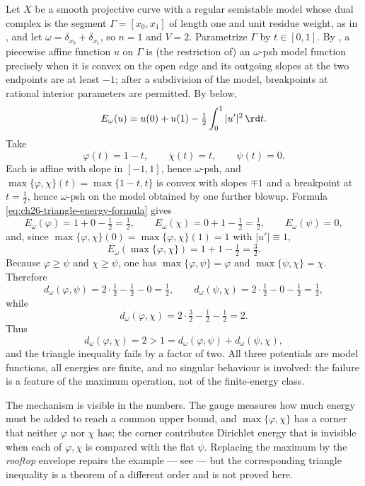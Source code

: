 \begin{example}
\label{ex:ch26-triangle-fails}
Let \(X\) be a smooth projective curve with a regular semistable model whose
dual complex is the segment \(\Gamma=[x_0,x_1]\) of length one and
unit residue weight, as in , and let
\(\omega=\delta_{x_0}+\delta_{x_1}\), so \(n=1\) and \(V=2\).  Parametrize
\(\Gamma\) by \(t\in[0,1]\).  By
, a piecewise affine function \(u\) on
\(\Gamma\) is (the restriction of) an \(\omega\)-psh model function precisely
when it is convex on the open edge and its outgoing slopes at the two
endpoints are at least \(-1\); after a subdivision of the model, breakpoints
at rational interior parameters are permitted.  By
 below,
\begin{equation}
\label{eq:ch26-triangle-energy-formula}
 E_\omega(u)=u(0)+u(1)-\tfrac12\int_0^1|u'|^2\,\rd t .
\end{equation}
Take
\[
 \varphi(t)=1-t,\qquad
 \chi(t)=t,\qquad
 \psi(t)=0 .
\]
Each is affine with slope in \([-1,1]\), hence \(\omega\)-psh, and
\(\max\{\varphi,\chi\}(t)=\max\{1-t,t\}\) is convex with slopes \(\mp1\) and
a breakpoint at \(t=\tfrac12\), hence \(\omega\)-psh on the model obtained by
one further blowup.  Formula \eqref{eq:ch26-triangle-energy-formula} gives
\[
 E_\omega(\varphi)=1+0-\tfrac12=\tfrac12,
 \qquad
 E_\omega(\chi)=0+1-\tfrac12=\tfrac12,
 \qquad
 E_\omega(\psi)=0,
\]
and, since \(\max\{\varphi,\chi\}(0)=\max\{\varphi,\chi\}(1)=1\) with
\(|u'|\equiv1\),
\[
 E_\omega(\max\{\varphi,\chi\})=1+1-\tfrac12=\tfrac32 .
\]
Because \(\varphi\geq\psi\) and \(\chi\geq\psi\), one has
\(\max\{\varphi,\psi\}=\varphi\) and \(\max\{\psi,\chi\}=\chi\).  Therefore
\[
 d_\omega(\varphi,\psi)=2\cdot\tfrac12-\tfrac12-0=\tfrac12,
 \qquad
 d_\omega(\psi,\chi)=2\cdot\tfrac12-0-\tfrac12=\tfrac12,
\]
while
\[
 d_\omega(\varphi,\chi)=2\cdot\tfrac32-\tfrac12-\tfrac12=2 .
\]
Thus
\[
 d_\omega(\varphi,\chi)=2
 >1=d_\omega(\varphi,\psi)+d_\omega(\psi,\chi),
\]
and the triangle inequality fails by a factor of two.  All three potentials
are model functions, all energies are finite, and no singular behaviour is
involved: the failure is a feature of the maximum operation, not of the
finite-energy class.

The mechanism is visible in the numbers.  The gauge measures how much energy
must be added to reach a common upper bound, and \(\max\{\varphi,\chi\}\)
has a corner that neither \(\varphi\) nor \(\chi\) has; the corner
contributes Dirichlet energy that is invisible when each of \(\varphi,\chi\)
is compared with the flat \(\psi\).  Replacing the maximum by the
\emph{rooftop} envelope repairs the example --- see
 --- but the corresponding triangle inequality
is a theorem of a different order and is not proved here.
\end{example}

